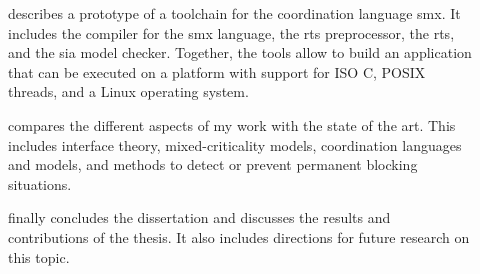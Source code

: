 \begin{description}
    \item[\Chap{\ref{chap_tool}}] describes a prototype of a toolchain for the coordination language \gls*{smx}.
        It includes the compiler for the \gls*{smx} language, the \gls{rts} preprocessor, the \gls{rts}, and the \gls{sia} model checker.
        Together, the tools allow to build an application that can be executed on a platform with support for ISO C, POSIX threads, and a Linux operating system.
    \item[\Chap{\ref{chap_related}}] compares the different aspects of my work with the state of the art.
        This includes interface theory, mixed-criticality models, coordination languages and models, and methods to detect or prevent permanent blocking situations.
    \item[\Chap{\ref{chap_conclusion}}] finally concludes the dissertation and discusses the results and contributions of the thesis.
        It also includes directions for future research on this topic.
\end{description}


